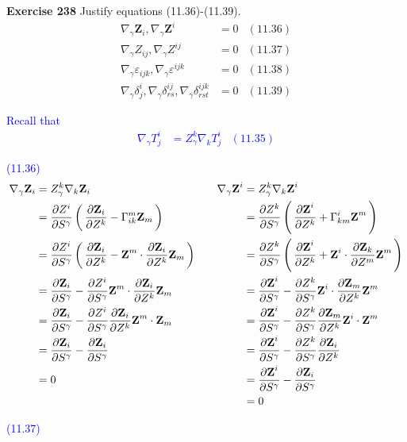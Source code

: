 \documentclass[12pt,a4paper]{report}
\newcommand{\BLUE}[1]{\textcolor{blue}{#1}}
\begin{document}
\textbf{Exercise 238} Justify equations (11.36)-(11.39).\begin{align*}
	\nabla_\gamma\textbf{Z}_i, \nabla_\gamma\textbf{Z}^i &= 0 &  (11.36)\\
	\nabla_\gamma Z_{ij}, \nabla_\gamma Z^{ij} &=0 & (11.37) \\
	\nabla_\gamma\varepsilon_{ijk}, \nabla_\gamma\varepsilon^{ijk} &= 0 & (11.38)\\
	\nabla_\gamma\delta_j^i, \nabla_\gamma\delta_{rs}^{ij}, \nabla_\gamma\delta_{rst}^{ijk} &= 0 & (11.39) 
\end{align*}
\BLUE{Recall that \begin{align*}
	\nabla_\gamma T_j^i &= Z_\gamma^k\nabla_kT_j^i & (11.35)
\end{align*}
\begin{description}
	\item (11.36)
	\begin{align*}
	\nabla_\gamma\textbf{Z}_i &= Z_\gamma^k \nabla_k \textbf{Z}_i & 
		&& \nabla_\gamma\textbf{Z}^i &= Z_\gamma^k \nabla_k  \textbf{Z}^i \\
	&= \frac{\partial Z^i}{\partial S^\gamma} \left (\, \frac{\partial \textbf{Z}_i}{\partial Z^k} - \Gamma^m_{ik}\textbf{Z}_m \,\right ) &
		&&  &= \frac{\partial Z^k}{\partial S^\gamma} \left (\, \frac{\partial \textbf{Z}^i}{\partial Z^k} + \Gamma^i_{km}\textbf{Z}^m \,\right )\\
	&= \frac{\partial Z^i}{\partial S^\gamma} \left (\, \frac{\partial \textbf{Z}_i}{\partial Z^k} - \textbf{Z}^m\cdot\frac{\partial \textbf{Z}_i}{\partial Z^k}\textbf{Z}_m \,\right ) &
		&&  &= \frac{\partial Z^k}{\partial S^\gamma} \left (\, \frac{\partial \textbf{Z}^i}{\partial Z^k} + \textbf{Z}^i\cdot\frac{\partial \textbf{Z}_k}{\partial Z^m}\textbf{Z}^m \,\right )\\ 
	&=  \frac{\partial \textbf{Z}_i}{\partial S^\gamma} - \frac{\partial Z^i}{\partial S^\gamma} \textbf{Z}^m\cdot\frac{\partial \textbf{Z}_i}{\partial Z^k}\textbf{Z}_m &
		&&  &= \frac{\partial \textbf{Z}^i}{\partial S^\gamma}  - \frac{\partial Z^k}{\partial S^\gamma}\textbf{Z}^i\cdot\frac{\partial \textbf{Z}_m}{\partial Z^k}\textbf{Z}^m\\ 
	&=  \frac{\partial \textbf{Z}_i}{\partial S^\gamma} - \frac{\partial Z^i}{\partial S^\gamma} \frac{\partial \textbf{Z}_i}{\partial Z^k}\textbf{Z}^m\cdot\textbf{Z}_m &
		&&  &= \frac{\partial \textbf{Z}^i}{\partial S^\gamma}  - \frac{\partial Z^k}{\partial S^\gamma}\frac{\partial \textbf{Z}_m}{\partial Z^k}\textbf{Z}^i\cdot\textbf{Z}^m\\
	&=  \frac{\partial \textbf{Z}_i}{\partial S^\gamma} -  \frac{\partial \textbf{Z}_i}{\partial S^\gamma} &
		&&  &= \frac{\partial \textbf{Z}^i}{\partial S^\gamma}  - \frac{\partial Z^k}{\partial S^\gamma}\frac{\partial \textbf{Z}_i}{\partial Z^k}\\
	&=0 &
		&&  &= \frac{\partial \textbf{Z}^i}{\partial S^\gamma}  - \frac{\partial \textbf{Z}_i}{\partial S^\gamma} \\ & & && &= 0
	\end{align*}
	\item (11.37)

\end{description}}
\end{document}
